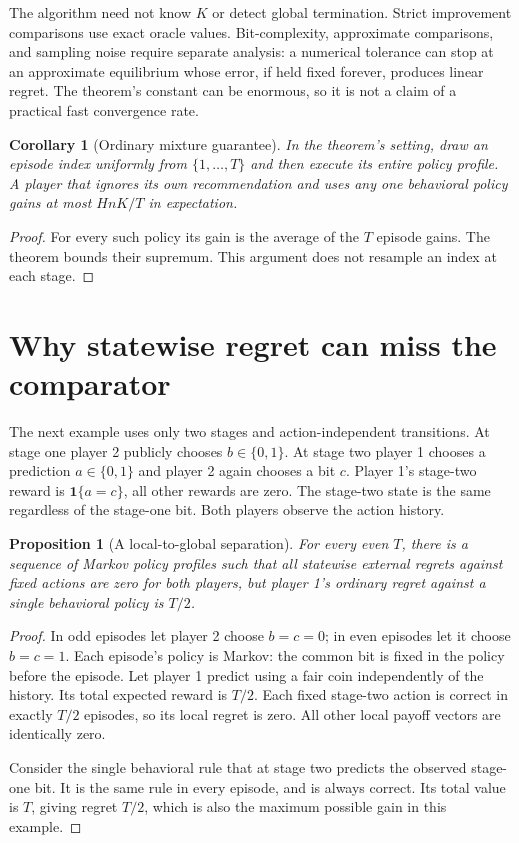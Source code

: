 \documentclass[11pt,a4paper]{article}
\newtheorem{proposition}[theorem]{Proposition}
\newtheorem{corollary}[theorem]{Corollary}
\theoremstyle{definition}
\theoremstyle{remark}
\newcommand{\ind}{\mathbf 1}
\begin{document}
The algorithm need not know $K$ or detect global termination. Strict improvement comparisons use exact oracle values. Bit-complexity, approximate comparisons, and sampling noise require separate analysis: a numerical tolerance can stop at an approximate equilibrium whose error, if held fixed forever, produces linear regret. The theorem's constant can be enormous, so it is not a claim of a practical fast convergence rate.

\begin{corollary}[Ordinary mixture guarantee]
In the theorem's setting, draw an episode index uniformly from $\{1,\ldots,T\}$ and then execute its entire policy profile. A player that ignores its own recommendation and uses any one behavioral policy gains at most $HnK/T$ in expectation.
\end{corollary}
\begin{proof}
For every such policy its gain is the average of the $T$ episode gains. The theorem bounds their supremum. This argument does not resample an index at each stage.
\end{proof}

\section{Why statewise regret can miss the comparator}
The next example uses only two stages and action-independent transitions. At stage one player 2 publicly chooses $b\in\{0,1\}$. At stage two player 1 chooses a prediction $a\in\{0,1\}$ and player 2 again chooses a bit $c$. Player 1's stage-two reward is $\ind\{a=c\}$, all other rewards are zero. The stage-two state is the same regardless of the stage-one bit. Both players observe the action history.

\begin{proposition}[A local-to-global separation]
For every even $T$, there is a sequence of Markov policy profiles such that all statewise external regrets against fixed actions are zero for both players, but player 1's ordinary regret against a single behavioral policy is $T/2$.
\end{proposition}
\begin{proof}
In odd episodes let player 2 choose $b=c=0$; in even episodes let it choose $b=c=1$. Each episode's policy is Markov: the common bit is fixed in the policy before the episode. Let player 1 predict using a fair coin independently of the history. Its total expected reward is $T/2$. Each fixed stage-two action is correct in exactly $T/2$ episodes, so its local regret is zero. All other local payoff vectors are identically zero.

Consider the single behavioral rule that at stage two predicts the observed stage-one bit. It is the same rule in every episode, and is always correct. Its total value is $T$, giving regret $T/2$, which is also the maximum possible gain in this example.
\end{proof}
\end{document}
